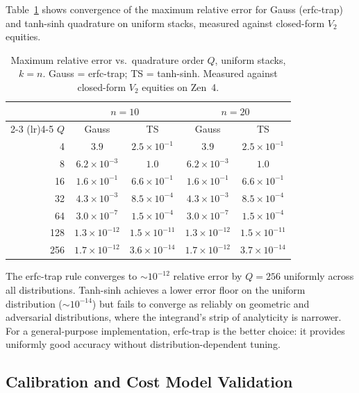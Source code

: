 \documentclass[11pt]{article}
\begin{document}
Table~\ref{tab:accuracy} shows convergence of the maximum relative error
for Gauss (erfc-trap) and tanh-sinh quadrature on uniform stacks, measured
against closed-form $V_2$ equities.

\begin{table}[t]
\centering
\caption{Maximum relative error vs.\ quadrature order $Q$, uniform stacks,
  $k = n$. Gauss = erfc-trap; TS = tanh-sinh. Measured against closed-form
  $V_2$ equities on Zen~4.}
\label{tab:accuracy}
\begin{tabular}{@{}r cc cc@{}}
\toprule
& \multicolumn{2}{c}{$n = 10$} & \multicolumn{2}{c}{$n = 20$} \\
\cmidrule(lr){2-3} \cmidrule(lr){4-5}
$Q$ & Gauss & TS & Gauss & TS \\
\midrule
4    & $3.9$                & $2.5 \times 10^{-1}$  & $3.9$                & $2.5 \times 10^{-1}$  \\
8    & $6.2 \times 10^{-3}$ & $1.0$                 & $6.2 \times 10^{-3}$ & $1.0$                 \\
16   & $1.6 \times 10^{-1}$ & $6.6 \times 10^{-1}$  & $1.6 \times 10^{-1}$ & $6.6 \times 10^{-1}$  \\
32   & $4.3 \times 10^{-3}$ & $8.5 \times 10^{-4}$  & $4.3 \times 10^{-3}$ & $8.5 \times 10^{-4}$  \\
64   & $3.0 \times 10^{-7}$ & $1.5 \times 10^{-4}$  & $3.0 \times 10^{-7}$ & $1.5 \times 10^{-4}$  \\
128  & $1.3 \times 10^{-12}$& $1.5 \times 10^{-11}$ & $1.3 \times 10^{-12}$& $1.5 \times 10^{-11}$ \\
256  & $1.7 \times 10^{-12}$& $3.6 \times 10^{-14}$ & $1.7 \times 10^{-12}$& $3.7 \times 10^{-14}$ \\
\bottomrule
\end{tabular}
\end{table}

The erfc-trap rule converges to ${\sim}10^{-12}$ relative error by
$Q = 256$ uniformly across all distributions. Tanh-sinh achieves a lower
error floor on the uniform distribution (${\sim}10^{-14}$) but fails to
converge as reliably on geometric and adversarial distributions, where
the integrand's strip of analyticity is narrower. For a general-purpose
implementation, erfc-trap is the better choice: it provides uniformly
good accuracy without distribution-dependent tuning.

\subsection{Calibration and Cost Model Validation}
\end{document}
